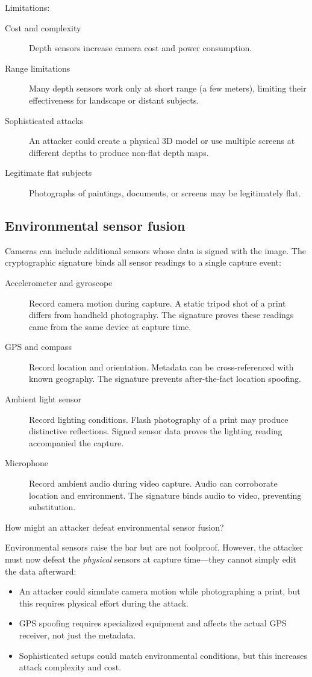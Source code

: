 Limitations:
\begin{description}
  \item[Cost and complexity] Depth sensors increase camera cost and power
    consumption.
  \item[Range limitations] Many depth sensors work only at short range (a few
    meters), limiting their effectiveness for landscape or distant subjects.
  \item[Sophisticated attacks] An attacker could create a physical 3D model or
    use multiple screens at different depths to produce non-flat depth maps.
  \item[Legitimate flat subjects] Photographs of paintings, documents, or
    screens may be legitimately flat.
\end{description}

\subsection{Environmental sensor fusion}

Cameras can include additional sensors whose data is signed with the image.
The cryptographic signature binds all sensor readings to a single capture event:
\begin{description}
  \item[Accelerometer and gyroscope] Record camera motion during capture.
    A static tripod shot of a print differs from handheld photography.
    The signature proves these readings came from the same device at capture
    time.
  \item[GPS and compass] Record location and orientation.
    Metadata can be cross-referenced with known geography.
    The signature prevents after-the-fact location spoofing.
  \item[Ambient light sensor] Record lighting conditions.
    Flash photography of a print may produce distinctive reflections.
    Signed sensor data proves the lighting reading accompanied the capture.
  \item[Microphone] Record ambient audio during video capture.
    Audio can corroborate location and environment.
    The signature binds audio to video, preventing substitution.
\end{description}

\begin{exercise}
  How might an attacker defeat environmental sensor fusion?
\end{exercise}

Environmental sensors raise the bar but are not foolproof.
However, the attacker must now defeat the \emph{physical} sensors at capture
time---they cannot simply edit the data afterward:
\begin{itemize}
  \item An attacker could simulate camera motion while photographing a print,
    but this requires physical effort during the attack.
  \item GPS spoofing requires specialized equipment and affects the actual GPS
    receiver, not just the metadata.
  \item Sophisticated setups could match environmental conditions, but this
    increases attack complexity and cost.
\end{itemize}

